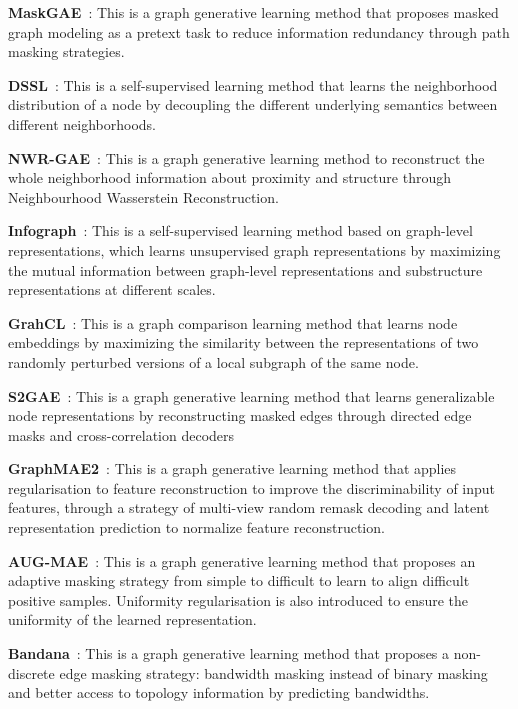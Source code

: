 \documentclass[sigconf]{acmart}
\begin{document}
\textbf{MaskGAE}~\cite{maskgae}: This is a graph generative learning method that proposes masked graph modeling as a pretext task to reduce information redundancy through path masking strategies.

\textbf{DSSL}~\cite{dssl}: This is a self-supervised learning method that learns the neighborhood distribution of a node by decoupling the different underlying semantics between different neighborhoods.

\textbf{NWR-GAE}~\cite{NWR-GAE}: This is a graph generative learning method to reconstruct the whole neighborhood information about proximity and structure through Neighbourhood Wasserstein Reconstruction.

\textbf{Infograph}~\cite{infograph}: This is a self-supervised learning method based on graph-level representations, which learns unsupervised graph representations by maximizing the mutual information between graph-level representations and substructure representations at different scales.

\textbf{GrahCL}~\cite{graphacl}: This is a graph comparison learning method that learns node embeddings by maximizing the similarity between the representations of two randomly perturbed versions of a local subgraph of the same node.

\textbf{S2GAE}~\cite{s2gae}: This is a graph generative learning method that learns generalizable node representations by reconstructing masked edges through directed edge masks and cross-correlation decoders

\textbf{GraphMAE2}~\cite{graphmae2}: This is a graph generative learning method that applies regularisation to feature reconstruction to improve the discriminability of input features, through a strategy of multi-view random remask decoding and latent representation prediction to normalize feature reconstruction.

\textbf{AUG-MAE}~\cite{augmae}: This is a graph generative learning method that proposes an adaptive masking strategy from simple to difficult to learn to align difficult positive samples. Uniformity regularisation is also introduced to ensure the uniformity of the learned representation.

\textbf{Bandana}~\cite{bandana}: This is a graph generative learning method that proposes a non-discrete edge masking strategy: bandwidth masking instead of binary masking and better access to topology information by predicting bandwidths.
\end{document}
